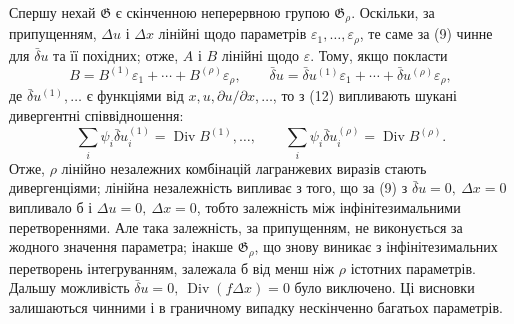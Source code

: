 \documentclass[11pt]{article}
\providecommand{\G}{\mathfrak G}
\providecommand{\eps}{\varepsilon}
\providecommand{\D}{\Delta}
\providecommand{\p}{\partial}
\DeclareMathOperator{\Div}{Div}
\providecommand{\bd}{\bar{\delta}}
\begin{document}
Спершу нехай \(\G\) є скінченною неперервною групою \(\G_\rho\). Оскільки, за припущенням, \(\D u\) і \(\D x\) лінійні щодо параметрів \(\eps_1,\ldots,\eps_\rho\), те саме за (9) чинне для \(\bd u\) та її похідних; отже, \(A\) і \(B\) лінійні щодо \(\eps\). Тому, якщо покласти
\[
B=B^{(1)}\eps_1+\cdots+B^{(\rho)}\eps_\rho,\qquad
\bd u=\bd u^{(1)}\eps_1+\cdots+\bd u^{(\rho)}\eps_\rho,
\]
де \(\bd u^{(1)},\ldots\) є функціями від \(x,u,\p u/\p x,\ldots\), то з (12) випливають шукані дивергентні співвідношення:
\begin{equation}
\sum_i\psi_i\bd u_i^{(1)}=\Div B^{(1)},\ldots,\qquad
\sum_i\psi_i\bd u_i^{(\rho)}=\Div B^{(\rho)}.
\tag{13}
\end{equation}
Отже, \(\rho\) лінійно незалежних комбінацій лагранжевих виразів стають дивергенціями; лінійна незалежність випливає з того, що за (9) з \(\bd u=0,\ \D x=0\) випливало б і \(\D u=0,\ \D x=0\), тобто залежність між інфінітезимальними перетвореннями. Але така залежність, за припущенням, не виконується за жодного значення параметра; інакше \(\G_\rho\), що знову виникає з інфінітезимальних перетворень інтегруванням, залежала б від менш ніж \(\rho\) істотних параметрів. Дальшу можливість \(\bd u=0,\ \Div(f\D x)=0\) було виключено. Ці висновки залишаються чинними і в граничному випадку нескінченно багатьох параметрів.
\end{document}
